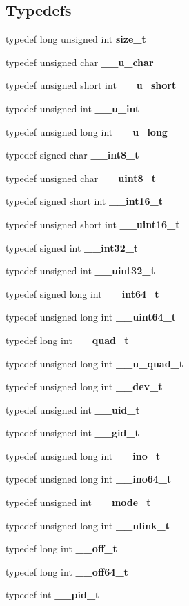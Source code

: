\subsection*{Typedefs}
\begin{DoxyCompactItemize}
\item 
typedef long unsigned int {\bf size\_\-t}
\item 
typedef unsigned char {\bf \_\-\_\-u\_\-char}
\item 
typedef unsigned short int {\bf \_\-\_\-u\_\-short}
\item 
typedef unsigned int {\bf \_\-\_\-u\_\-int}
\item 
typedef unsigned long int {\bf \_\-\_\-u\_\-long}
\item 
typedef signed char {\bf \_\-\_\-int8\_\-t}
\item 
typedef unsigned char {\bf \_\-\_\-uint8\_\-t}
\item 
typedef signed short int {\bf \_\-\_\-int16\_\-t}
\item 
typedef unsigned short int {\bf \_\-\_\-uint16\_\-t}
\item 
typedef signed int {\bf \_\-\_\-int32\_\-t}
\item 
typedef unsigned int {\bf \_\-\_\-uint32\_\-t}
\item 
typedef signed long int {\bf \_\-\_\-int64\_\-t}
\item 
typedef unsigned long int {\bf \_\-\_\-uint64\_\-t}
\item 
typedef long int {\bf \_\-\_\-quad\_\-t}
\item 
typedef unsigned long int {\bf \_\-\_\-u\_\-quad\_\-t}
\item 
typedef unsigned long int {\bf \_\-\_\-dev\_\-t}
\item 
typedef unsigned int {\bf \_\-\_\-uid\_\-t}
\item 
typedef unsigned int {\bf \_\-\_\-gid\_\-t}
\item 
typedef unsigned long int {\bf \_\-\_\-ino\_\-t}
\item 
typedef unsigned long int {\bf \_\-\_\-ino64\_\-t}
\item 
typedef unsigned int {\bf \_\-\_\-mode\_\-t}
\item 
typedef unsigned long int {\bf \_\-\_\-nlink\_\-t}
\item 
typedef long int {\bf \_\-\_\-off\_\-t}
\item 
typedef long int {\bf \_\-\_\-off64\_\-t}
\item 
typedef int {\bf \_\-\_\-pid\_\-t}
\item 

\end{DoxyCompactItemize}
